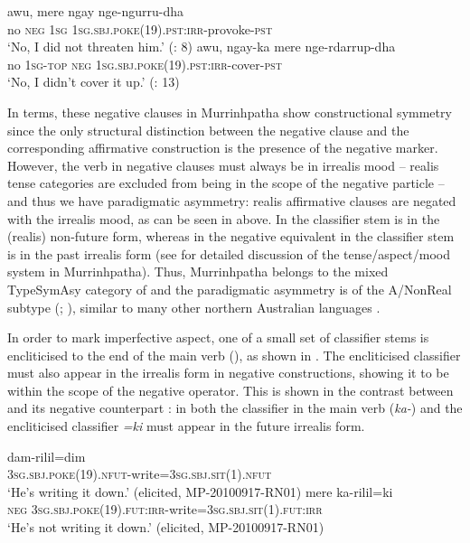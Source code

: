 \documentclass[output=paper,colorlinks,citecolor=brown]{langscibook}
\begin{document}
\ea\label{ex:mur:9}
    \ea\label{ex:mur:9a}
        \gll  awu, mere ngay nge-ngurru-dha\\ 
              no \textsc{neg} \textsc{1sg} \textsc{1sg.sbj.poke(19).pst:irr}{}-provoke-\textsc{pst}\\
        \glt ‘No, I did not threaten him.’ (\citealt{FordMcCormack2011}: 8)
    \ex\label{ex:mur:9b}
        \gll  awu, ngay-ka mere nge-rdarrup-dha\\
              no \textsc{1sg-top} \textsc{neg} \textsc{1sg.sbj.poke(19).pst:irr-}cover-\textsc{pst}\\
        \glt ‘No, I didn't cover it up.’ (\citealt{FordMcCormack2011}: 13)
\z
\z  

In  terms, these negative clauses in Murrinhpatha show constructional symmetry since the only structural distinction between the negative clause and the corresponding affirmative construction is the presence of the negative marker. However, the verb in negative clauses must always be in irrealis mood – realis tense categories are excluded from being in the scope of the negative particle – and thus we have paradigmatic asymmetry: realis affirmative clauses are negated with the irrealis mood, as can be seen in  above. In  the classifier stem is in the (realis) non-future form, whereas in the negative equivalent in  the classifier stem is in the past irrealis form (see \citet{NordlingerCaudal2012} for detailed discussion of the tense/aspect/mood system in Murrinhpatha). Thus, Murrinhpatha belongs to the mixed TypeSymAsy category of \citet{Miestamo2013-wals114} and the paradigmatic asymmetry is of the A/NonReal subtype (\citealt{Miestamo2005}; \citealt{Miestamo2013-wals114}), similar to many other northern Australian languages \citep{Miestamo2007}.

In order to mark imperfective aspect, one of a small set of classifier stems is encliticised to the end of the main verb (\citealt{NordlingerCaudal2012}), as shown in . The encliticised classifier must also appear in the irrealis form in negative constructions, showing it to be within the scope of the negative operator. This is shown in the contrast between  and its negative counterpart : in  both the classifier in the main verb (\textit{ka-}) and the encliticised classifier \textit{=ki} must appear in the future irrealis form.

\ea\label{ex:mur:10}
    \ea\label{ex:mur:10a}
        \gll  dam-rilil=dim\\ 
              \textsc{3sg.sbj.poke(19).nfut-}write\textsc{=3sg.sbj.sit(1).nfut}\\
        \glt ‘He’s writing it down.’ (elicited, MP-20100917-RN01)
    \ex\label{ex:mur:10b}
        \gll  mere ka-rilil=ki\\
              \textsc{neg} \textsc{3sg.sbj.poke(19).fut:irr-}write\textsc{=3sg.sbj.sit(1).fut:irr}\\
        \glt ‘He’s not writing it down.’ (elicited, MP-20100917-RN01)
    \z
\z 
\end{document}
